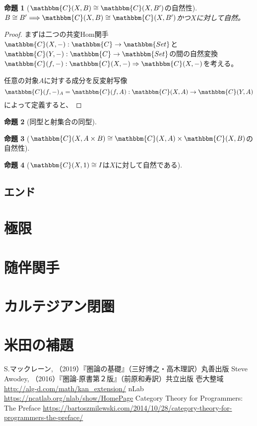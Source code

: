 \documentclass[uplatex,dvipdfmx]{jsarticle}
\newcommand{\cat}[1]{\mathbbm{#1}}
\newcommand{\arrow}{\rightarrow}
\newcommand{\functor}[3]{#1:\cat{#2}\arrow \cat{#3}}
\newcommand{\nat}[3]{#1:#2\Rightarrow #3}
\newcommand{\mor}[3]{#1:#2\arrow #3}
\newcommand{\arset}[3]{\cat{#1}(#2,#3)}
\newtheorem{proof}{証明}[section]
\newtheorem{prop}{命題}[section]
\numberwithin{proof}{subsection}
\numberwithin{prop}{subsection}
\numberwithin{define}{subsection}
\begin{document}
  \begin{prop}[$\arset{C}{X}{B}\cong\arset{C}{X}{B'}$の自然性]
    $B\cong B'\Longrightarrow \arset{C}{X}{B}\cong\arset{C}{X}{B'}$かつ$X$に対して自然。
  \end{prop}
  \begin{proof}
    まずは二つの共変Hom関手$\functor{\arset{C}{X}{-}}{C}{Set}$と$\functor{\arset{C}{Y}{-}}{C}{Set}$の間の自然変換$\nat{\arset{C}{f}{-}}{\arset{C}{X}{-}}{\arset{C}{X}{-}}$を考える。
    
    任意の対象$A$に対する成分を反変射写像\[\mor{\arset{C}{f}{-}_A=\arset{C}{f}{A}}{\arset{C}{X}{A}}{\arset{C}{Y}{A}}\]によって定義すると、
    


  \end{proof}
  \begin{prop}[同型と射集合の同型]

  \end{prop}
  \begin{prop}[$\arset{C}{X}{A\times B}\cong \arset{C}{X}{A}\times \arset{C}{X}{B}$の自然性]
  \end{prop}
  \begin{prop}[$\arset{C}{X}{1}\cong I$は$X$に対して自然である]
  \end{prop}
	\subsection{エンド}
	\section{極限}
	\section{随伴関手}
	\section{カルテジアン閉圏}
	\section{米田の補題}

	\begin{thebibliography}{99}
	 S.マックレーン, （2019）『圏論の基礎』（三好博之・高木理訳）丸善出版
	 Steve Awodey, （2016）『圏論-原書第２版』（前原和寿訳）共立出版
	 壱大整域 \url{http://alg-d.com/math/kan_extension/}
	 nLab \url{https://ncatlab.org/nlab/show/HomePage}
	 Category Theory for Programmers: The Preface \url{https://bartoszmilewski.com/2014/10/28/category-theory-for-programmers-the-preface/}
	\end{thebibliography}
\end{document}
